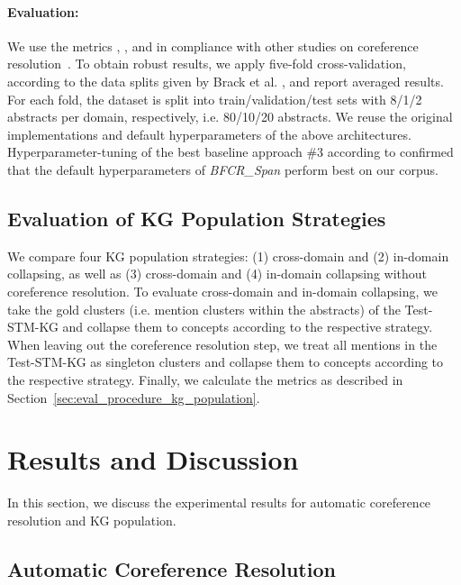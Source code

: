 \documentclass[runningheads]{llncs}
\begin{document}
\paragraph{Evaluation:}
We use the metrics  \cite{VilainBACH95MUC},  \cite{Bagga98B3},  \cite{Luo05CEAF} and  \cite{Pradhan2014Scoring} in compliance with other studies on coreference resolution~\cite{Joshi2020BFCR,Ma0LHPSL20JointlyCoreference,Lee2017EndtoendNC}.
To obtain robust results, we apply five-fold cross-validation, according to the data splits given by Brack et al. \cite{Brack2020DomainindependentEO}, and report averaged results.
For each fold, the dataset is split into train/validation/test sets with 8/1/2 abstracts per domain, respectively, i.e. 80/10/20 abstracts.  
We reuse the original implementations and default hyperparameters of the above architectures. 
Hyperparameter-tuning of the best baseline approach \#3 according to \cite{Joshi2020BFCR} confirmed that the default hyperparameters of \emph{BFCR\_Span} perform best on our corpus.

\subsection{Evaluation of KG Population Strategies}

We compare four KG population strategies: (1) cross-domain and (2) in-domain collapsing, as well as (3) cross-domain and (4) in-domain collapsing without coreference resolution. 
To evaluate cross-domain and in-domain collapsing, we take the gold clusters (i.e. mention clusters within the abstracts) of the Test-STM-KG and collapse them to concepts according to the respective strategy.
When leaving out the coreference resolution step, we treat all mentions in the Test-STM-KG as singleton clusters and collapse them to concepts according to the respective strategy. Finally, we calculate the metrics as described in Section~\ref{sec:eval_procedure_kg_population}.



\section{Results and Discussion}
In this section, we discuss the experimental results for automatic coreference resolution and KG population. 



\subsection{Automatic Coreference Resolution}
\end{document}
